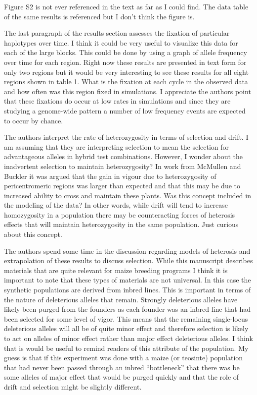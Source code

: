 \documentclass[onecolumn,oneside,letterpaper]{article}
\begin{document}
Figure S2 is not ever referenced in the text as far as I could find.  The data 
table of the same results is referenced but I don’t think the figure is.  

The last paragraph of the results section assesses the fixation of particular 
haplotypes over time.  I think it could be very useful to visualize this data 
for each of the large blocks.  This could be done by using a graph of allele 
frequency over time for each region.  Right now these results are presented in 
text form for only two regions but it would be very interesting to see these 
results for all eight regions shown in table 1.  What is the fixation at each 
cycle in the observed data and how often was this region fixed in simulations.  
I appreciate the authors point that these fixations do occur at low rates in 
simulations and since they are studying a genome-wide pattern a number of low 
frequency events are expected to occur by chance.

The authors interpret the rate of heterozygosity in terms of selection and 
drift.  I am assuming that they are interpreting selection to mean the selection 
for advantageous alleles in hybrid test combinations.  However, I wonder about 
the inadvertent selection to maintain heterozygosity?  In work from McMullen and 
Buckler it was argued that the gain in vigour due to heterozygosity of 
pericentromeric regions was larger than expected and that this may be due to 
increased ability to cross and maintain these plants.  Was this concept included 
in the modeling of the data?  In other words, while drift will tend to increase 
homozygosity in a population there may be counteracting forces of heterosis 
effects that will maintain heterozygosity in the same population.  Just curious 
about this concept.

The authors spend some time in the discussion regarding models of heterosis and 
extrapolation of these results to discuss selection.  While this manuscript 
describes materials that are quite relevant for maize breeding programs I think 
it is important to note that these types of materials are not universal.  In 
this case the synthetic populations are derived from inbred lines.  This is 
important in terms of the nature of deleterious alleles that remain.  Strongly 
deleterious alleles have likely been purged from the founders as each founder 
was an inbred line that had been selected for some level of vigor.  This means 
that the remaining single-locus deleterious alleles will all be of quite minor 
effect and therefore selection is likely to act on alleles of minor effect 
rather than major effect deleterious alleles.  I think that is would be useful 
to remind readers of this attribute of the population.  My guess is that if this 
experiment was done with a maize (or teosinte) population that had never been 
passed through an inbred “bottleneck” that there was be some alleles of major 
effect that would be purged quickly and that the role of drift and selection 
might be slightly different.
\end{document}
